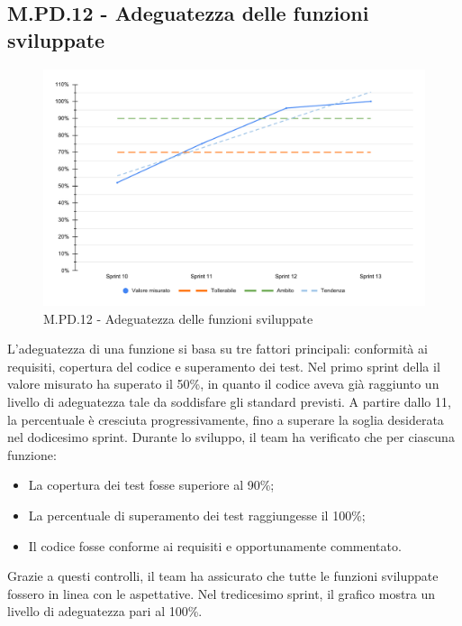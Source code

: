 \subsection{M.PD.12 - Adeguatezza delle funzioni sviluppate}

\begin{figure}[H]
  \centering
  \includegraphics[width=\textwidth]{assets/adeguatezza_funzioni.pdf}
  \caption{M.PD.12 - Adeguatezza delle funzioni sviluppate}
\end{figure}

\par L'adeguatezza di una funzione si basa su tre fattori principali: conformità ai requisiti, copertura del codice e superamento dei test. Nel primo sprint della  il valore misurato ha superato il 50\%, in quanto il codice  aveva già raggiunto un livello di adeguatezza tale da soddisfare gli standard previsti. A partire dallo  11, la percentuale è cresciuta progressivamente, fino a superare la soglia desiderata nel dodicesimo sprint. Durante lo sviluppo, il team ha verificato che per ciascuna funzione:
\begin{itemize}
  \item La copertura dei test fosse superiore al 90\%;
  \item La percentuale di superamento dei test raggiungesse il 100\%;
  \item Il codice fosse conforme ai requisiti e opportunamente commentato.
\end{itemize}

\vspace{0.5\baselineskip}
\par Grazie a questi controlli, il team ha assicurato che tutte le funzioni sviluppate fossero in linea con le aspettative. Nel tredicesimo sprint, il grafico mostra un livello di adeguatezza pari al 100\%.